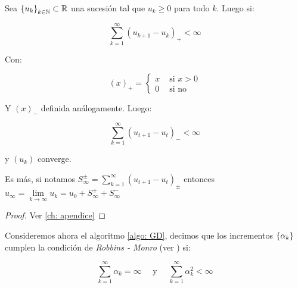 \begin{lemma}
	\label{lemma: Convergencia de sucesiones positivas acotadas sumables}
	Sea $\left\lbrace u_k\right\rbrace_{k \in {\mathbb{N}}} \subset {\mathbb{R}}$ una sucesi\'on tal que $u_k \geq 0$ para todo $k$. Luego si:
	
	\begin{equation*}
		\sum\limits_{k=1}^{\infty} {\left(u_{k+1} - u_k\right)_{+}} < \infty
	\end{equation*}
	
	Con:
	
	\begin{equation*}
		(x)_+ = \left\lbrace \begin{array}{cc}
		x & \text{ si } x >0 \\
		0 & \text{ si no}
		\end{array}\right.
	\end{equation*}
	
	Y $(x)_-$ definida an\'alogamente. Luego:
	
	\begin{equation*}
		\sum\limits_{k=1}^{\infty} {\left(u_{t+1} - u_t\right)_{-}} < \infty
	\end{equation*}
	
	 y $\left(u_k\right)$ converge. 
	 
	 Es m\'as, si notamos $S^{\pm}_{\infty} = \sum\limits_{k=1}^{\infty}  {\left(u_{t+1} - u_t\right)_{\pm}} $ entonces $u_{\infty} = \lim\limits_{k \rightarrow \infty} {u_k} = u_0 + S_{\infty}^+ + S_{\infty}^-$
\end{lemma}

\begin{proof}
	Ver \ref{ch: apendice}
\end{proof}

Consideremos ahora el algoritmo \ref{algo: GD}, decimos que los incrementos $\left\lbrace\alpha_k\right\rbrace$  cumplen la condici\'on de \textit{Robbins - Monro} (ver \cite{robbins:1951}) si:

\begin{equation}
\label{eq: Condicion robbins monro}
\sum\limits_{k=1}^{\infty} {\alpha_k} = \infty \quad \text{ y } \quad \sum\limits_{k=1}^{\infty} {\alpha_k^2} < \infty
\end{equation}

